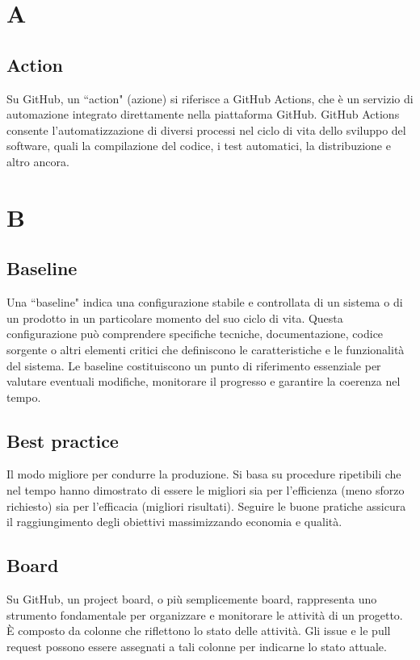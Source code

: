 \documentclass[8pt]{article}
\begin{document}
	\section*{A}
	\subsection*{Action}
	Su GitHub, un ``action" (azione) si riferisce a GitHub Actions, che è un servizio di automazione integrato direttamente nella piattaforma GitHub. GitHub Actions consente l'automatizzazione di diversi processi nel ciclo di vita dello sviluppo del software, quali la compilazione del codice, i test automatici, la distribuzione e altro ancora.
	\newpage
	\section*{B}
	\subsection*{Baseline}
	Una ``baseline" indica una configurazione stabile e controllata di un sistema o di un prodotto in un particolare momento del suo ciclo di vita. Questa configurazione può comprendere specifiche tecniche, documentazione, codice sorgente o altri elementi critici che definiscono le caratteristiche e le funzionalità del sistema. Le baseline costituiscono un punto di riferimento essenziale per valutare eventuali modifiche, monitorare il progresso e garantire la coerenza nel tempo.
	\subsection*{Best practice}
	Il modo migliore per condurre la produzione. Si basa su procedure ripetibili che nel tempo hanno dimostrato di essere le migliori sia per l'efficienza (meno sforzo richiesto) sia per l'efficacia (migliori risultati). Seguire le buone pratiche assicura il raggiungimento degli obiettivi massimizzando economia e qualità.
	\subsection*{Board}
	Su GitHub, un project board, o più semplicemente board, rappresenta uno strumento fondamentale per organizzare e monitorare le attività di un progetto. È composto da colonne che riflettono lo stato delle attività. Gli issue e le pull request possono essere assegnati a tali colonne per indicarne lo stato attuale.
\end{document}
